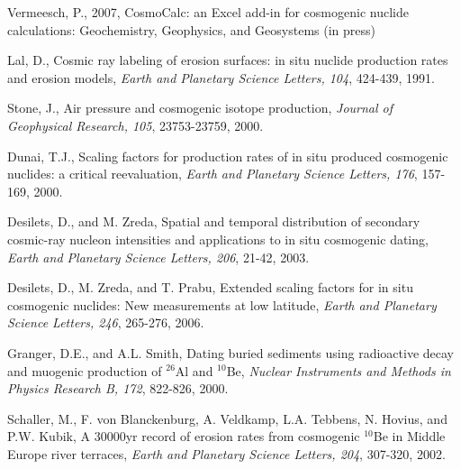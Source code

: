 \documentclass[12pt]{article}
\begin{document}
\begin{thebibliography}{}

  Vermeesch,  P.,  2007,  CosmoCalc:  an  Excel
  add-in   for    cosmogenic   nuclide   calculations:   Geochemistry,
  Geophysics, and Geosystems (in press)
  
 Lal, D., Cosmic ray labeling of erosion surfaces: in
  situ  nuclide production rates  and erosion  models, {\it  Earth and
    Planetary Science Letters, 104}, 424-439, 1991.
  
  Stone, J.,  Air pressure  and  cosmogenic isotope
  production, {\it Journal of Geophysical Research, 105}, 23753-23759,
  2000.
  
 Dunai, T.J.,  Scaling factors for production rates
  of in  situ produced  cosmogenic nuclides: a  critical reevaluation,
  {\it Earth and Planetary Science Letters, 176}, 157-169, 2000.
  
  Desilets,  D.,   and  M.  Zreda,  Spatial  and
  temporal  distribution of  secondary cosmic-ray  nucleon intensities
  and  applications  to in  situ  cosmogenic  dating,  {\it Earth  and
    Planetary Science Letters, 206}, 21-42, 2003.
  
 Desilets, D., M.  Zreda, and T. Prabu, Extended
  scaling factors for in situ cosmogenic nuclides: New measurements at
  low  latitude,  {\it  Earth  and Planetary  Science  Letters,  246},
  265-276, 2006.
  
  Granger, D.E.,  and A.L.  Smith,  Dating buried
  sediments  using  radioactive   decay  and  muogenic  production  of
  $^{26}$Al  and $^{10}$Be,  {\it Nuclear  Instruments and  Methods in
    Physics Research B, 172}, 822-826, 2000.
  
 Schaller, M., F. von Blanckenburg, A. Veldkamp,
  L.A.  Tebbens, N.   Hovius, and  P.W.   Kubik, A  30000yr record  of
  erosion  rates  from cosmogenic  $^{10}$Be  in  Middle Europe  river
  terraces, {\it  Earth and Planetary Science  Letters, 204}, 307-320,
  2002.

\end{thebibliography}
\end{document}
